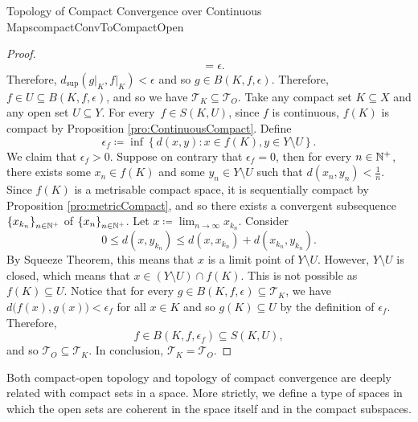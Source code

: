 \documentclass[math]{amznotes}
\theoremstyle{remark}
\begin{document}
\begin{probox}{Topology of Compact Convergence over Continuous Maps}{compactConvToCompactOpen}
\begin{proof}
\begin{align*}
            & = \epsilon.
        \end{align*}
        Therefore, $d_{\sup}\left(\left.g\right\rvert_K, \left.f\right\rvert_K\right) < \epsilon$ and so $g \in B\left(K, f, \epsilon\right)$. Therefore, $f \in U \subseteq B\left(K, f, \epsilon\right)$, and so we have $\mathcal{T}_K \subseteq \mathcal{T}_O$. Take any compact set $K \subseteq X$ and any open set $U \subseteq Y$. For every~$f \in S\left(K, U\right)$, since $f$ is continuous, $f\left(K\right)$ is compact by Proposition \ref{pro:ContinuousCompact}. Define 
        \begin{equation*}
            \epsilon_f \coloneqq \inf\left\{d\left(x, y\right) \colon x \in f\left(K\right), y \in Y \setminus U\right\}.
        \end{equation*}
        We claim that $\epsilon_f > 0$. Suppose on contrary that $\epsilon_f = 0$, then for every $n \in \mathbb{N}^+$, there exists some $x_n \in f\left(K\right)$ and some $y_n \in Y \setminus U$ such that $d\left(x_n, y_n\right) < \frac{1}{n}$. Since $f\left(K\right)$ is a metrisable compact space, it is sequentially compact by Proposition \ref{pro:metricCompact}, and so there exists a convergent subsequence $\left\{x_{k_n}\right\}_{n \in \mathbb{N}^+}$ of $\left\{x_n\right\}_{n \in \mathbb{N}^+}$. Let $x \coloneqq \lim_{n \to \infty}x_{k_n}$. Consider 
        \begin{equation*}
            0 \leq d\left(x, y_{k_n}\right) \leq d\left(x, x_{k_n}\right) + d\left(x_{k_n}, y_{k_n}\right).
        \end{equation*}
        By Squeeze Theorem, this means that $x$ is a limit point of $Y \setminus U$. However, $Y \setminus U$ is closed, which means that $x \in \left(Y \setminus U\right) \cap f\left(K\right)$. This is not possible as~$f\left(K\right) \subseteq U$. Notice that for every $g \in B\left(K, f, \epsilon\right) \subseteq \mathcal{T}_K$, we have $d\bigl(f\left(x\right), g\left(x\right)\bigr) < \epsilon_f$ for all $x \in K$ and so $g\left(K\right) \subseteq U$ by the definition of $\epsilon_f$. Therefore, 
        \begin{equation*}
            f \in B\left(K, f, \epsilon_f\right) \subseteq S\left(K, U\right),
        \end{equation*}
        and so $\mathcal{T}_O \subseteq \mathcal{T}_K$. In conclusion, $\mathcal{T}_K = \mathcal{T}_O$.
    \end{proof}
\end{probox}
Both compact-open topology and topology of compact convergence are deeply related with compact sets in a space. More strictly, we define a type of spaces in which the open sets are coherent in the space itself and in the compact subspaces.
\end{document}
